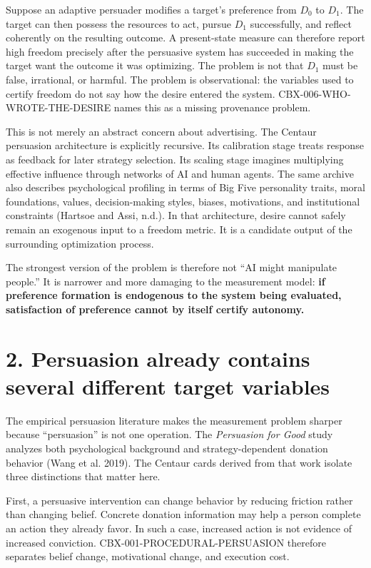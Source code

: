 \documentclass[
  10pt,
]{article}
\begin{document}
Suppose an adaptive persuader modifies a target's preference from
\(D_0\) to \(D_1\). The target can then possess the resources to act,
pursue \(D_1\) successfully, and reflect coherently on the resulting
outcome. A present-state measure can therefore report high freedom
precisely after the persuasive system has succeeded in making the target
want the outcome it was optimizing. The problem is not that \(D_1\) must
be false, irrational, or harmful. The problem is observational: the
variables used to certify freedom do not say how the desire entered the
system. CBX-006-WHO-WROTE-THE-DESIRE names this as a missing provenance
problem.

This is not merely an abstract concern about advertising. The Centaur
persuasion architecture is explicitly recursive. Its calibration stage
treats response as feedback for later strategy selection. Its scaling
stage imagines multiplying effective influence through networks of AI
and human agents. The same archive also describes psychological
profiling in terms of Big Five personality traits, moral foundations,
values, decision-making styles, biases, motivations, and institutional
constraints (Hartsoe and Assi, n.d.). In that architecture, desire
cannot safely remain an exogenous input to a freedom metric. It is a
candidate output of the surrounding optimization process.

The strongest version of the problem is therefore not ``AI might
manipulate people.'' It is narrower and more damaging to the measurement
model: \textbf{if preference formation is endogenous to the system being
evaluated, satisfaction of preference cannot by itself certify
autonomy.}

\section{2. Persuasion already contains several different target
variables}\label{persuasion-already-contains-several-different-target-variables}

The empirical persuasion literature makes the measurement problem
sharper because ``persuasion'' is not one operation. The
\emph{Persuasion for Good} study analyzes both psychological background
and strategy-dependent donation behavior (Wang et al. 2019). The Centaur
cards derived from that work isolate three distinctions that matter
here.

First, a persuasive intervention can change behavior by reducing
friction rather than changing belief. Concrete donation information may
help a person complete an action they already favor. In such a case,
increased action is not evidence of increased conviction.
CBX-001-PROCEDURAL-PERSUASION therefore separates belief change,
motivational change, and execution cost.
\end{document}

